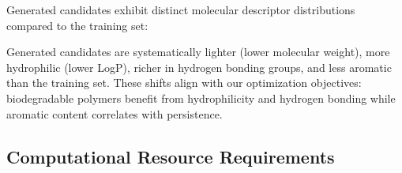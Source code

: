 \documentclass[twocolumn,10pt]{article}
\begin{document}
Generated candidates exhibit distinct molecular descriptor distributions compared to the training set:

\begin{table}[!ht]
\centering
\caption{Molecular descriptor statistics for training set vs. generated candidates.}
\label{tab:descriptors}
\end{table}

Generated candidates are systematically lighter (lower molecular weight), more hydrophilic (lower LogP), richer in hydrogen bonding groups, and less aromatic than the training set. These shifts align with our optimization objectives: biodegradable polymers benefit from hydrophilicity and hydrogen bonding while aromatic content correlates with persistence.

\subsection{Computational Resource Requirements}

\begin{table}[!ht]
\centering
\caption{Detailed computational resource requirements by pipeline phase.}
\label{tab:resources}
\end{table}
\end{document}

